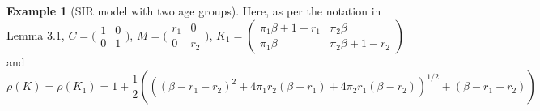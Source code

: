 \documentclass{article}
\theoremstyle{definition}
\newtheorem{example}{Example}
\begin{document}
\begin{example}[SIR model with two age groups]
Here, as per the notation in Lemma 3.1,   $C=\big(\begin{smallmatrix} 1  & 0 \\ 0 & 1\end{smallmatrix}\big)$, $M=\big(\begin{smallmatrix} r_1  & 0 \\ 0 & r_2\end{smallmatrix}\big)$,
$K_1 = \left (\begin{matrix} \pi_1 \beta + 1 - r_1 & \pi_2 \beta  \\ \pi_1 \beta & \pi_2 \beta + 1 - r_2  \end{matrix} \right)$ and \[\rho(K) =\rho(K_1)=1+\frac{1}{2}\left(\left ((\beta-r_1-r_2)^2+4\pi_1r_2(\beta-r_1)+4\pi_2r_1(\beta-r_2) \right )^{1/2}+(\beta-r_1-r_2)\right)\]
  


\end{example}
\end{document}
